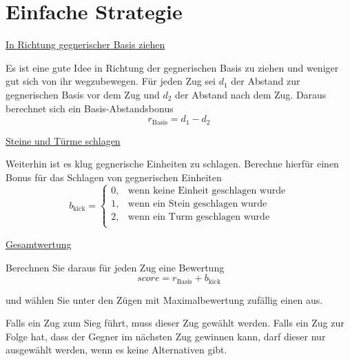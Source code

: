 \section*{Einfache Strategie}
\underline{In Richtung gegnerischer Basis ziehen}

Es ist eine gute Idee in Richtung der gegnerischen Basis zu ziehen und weniger gut sich von ihr wegzubewegen. Für jeden Zug sei $d_1$ der Abstand zur gegnerischen Basis vor dem Zug und $d_2$ der Abstand nach dem Zug. Daraus berechnet sich ein Basis-Abstandsbonus \[r_\text{Basis} = d_1 - d_2\]

\underline{Steine und Türme schlagen}

Weiterhin ist es klug gegnerische Einheiten zu schlagen. Berechne hierfür einen Bonus für das Schlagen von gegnerischen Einheiten \[b_\text{kick} = \begin{cases}
0, & \text{wenn keine Einheit geschlagen wurde} \\
1, & \text{wenn ein Stein geschlagen wurde} \\
2, & \text{wenn ein Turm geschlagen wurde} \\
\end{cases}\]

\underline{Gesamtwertung}

Berechnen Sie daraus für jeden Zug eine Bewertung
\[score = r_\text{Basis} + b_\text{kick}\]

und wählen Sie unter den Zügen mit Maximalbewertung zufällig einen aus.

Falls ein Zug zum Sieg führt, muss dieser Zug gewählt werden. Falls ein Zug zur Folge hat, dass der Gegner im nächsten Zug gewinnen kann, darf dieser nur ausgewählt werden, wenn es keine Alternativen gibt.